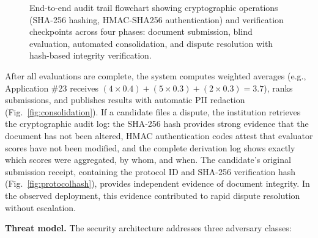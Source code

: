 \documentclass[preprint,12pt,a4paper]{elsarticle}
\providecommand{\DIFaddendFL}{} %
\DeclareRobustCommand{\DIFaddendFL}{\DIFOaddendFL \let\includegraphics\DIFOincludegraphics} %
\begin{document}
\begin{figure}[H]
{%
}\DIFaddendFL %
\caption{End-to-end audit trail flowchart showing cryptographic operations (SHA-256 hashing, HMAC-SHA256 authentication) and verification checkpoints across four phases: document submission, blind evaluation, automated consolidation, and dispute resolution with hash-based integrity verification.}
\label{fig:auditflow}
\end{figure}

After all evaluations are complete, the system computes weighted averages (e.g., Application \#23 receives $(4 \times 0.4) + (5 \times 0.3) + (2 \times 0.3) = 3.7$), ranks submissions, and publishes results with automatic PII redaction (Fig.~\ref{fig:consolidation}). If a candidate files a dispute, the institution retrieves the cryptographic audit log: the SHA-256 hash provides strong evidence that the document has not been altered, HMAC authentication codes attest that evaluator scores have not been modified, and the complete derivation log shows exactly which scores were aggregated, by whom, and when. The candidate's original submission receipt, containing the protocol ID and SHA-256 verification hash (Fig.~\ref{fig:protocolhash}), provides independent evidence of document integrity. In the observed deployment, this evidence contributed to rapid dispute resolution without escalation.

\textbf{Threat model.} The security architecture addresses three adversary classes:
\end{document}
